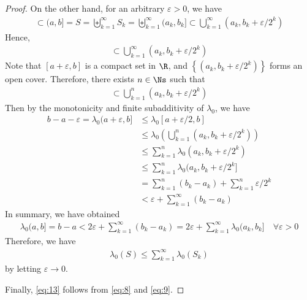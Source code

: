 \documentclass[thmcnt=section, 12pt]{elegantbook}
\begin{document}
\begin{proof}
    \par On the other hand, for an arbitrary $\varepsilon > 0$, we have 
    \begin{align*}
        [a + \varepsilon, b]
        \subset (a, b]
        = S
        = \biguplus_{k=1}^\infty S_k
        = \biguplus_{k=1}^\infty (a_k, b_k]
        \subset \bigcup_{k=1}^\infty (a_k, b_k + \varepsilon / 2^k)
    \end{align*}
    Hence,
    \begin{align*}
        [a + \varepsilon, b]
        \subset \bigcup_{k=1}^\infty (a_k, b_k + \varepsilon / 2^k)
    \end{align*}
    Note that $[a + \varepsilon, b]$ is a compact set in $\R$, and $\left\{(a_k, b_k + \varepsilon / 2^k)\right\}$ forms an open cover. Therefore, there exists $n \in \Ns$ such that 
    \begin{align*}
        [a + \varepsilon, b]
        \subset \bigcup_{k=1}^n (a_k, b_k + \varepsilon / 2^k)
    \end{align*}
    Then by the monotonicity and finite subadditivity of $\lambda_0$, we have 
    \begin{align*}
        b-a-\varepsilon 
        = \lambda_0 (a+\varepsilon, b]  
        &\leq \lambda_0 [a+\varepsilon/2, b] \\
        &\leq \lambda_0 \left( \bigcup_{k=1}^n (a_k, b_k + \varepsilon / 2^k) \right) \\
        &\leq \sum_{k=1}^n \lambda_0 (a_k, b_k + \varepsilon / 2^k) \\ 
        &\leq \sum_{k=1}^n \lambda_0 (a_k, b_k + \varepsilon / 2^k] \\
        &= \sum_{k=1}^n (b_k - a_k) + 
        \sum_{k=1}^n \varepsilon/2^k \\
        &< \varepsilon + \sum_{k=1}^\infty (b_k - a_k)
    \end{align*}
    In summary, we have obtained
    \begin{align*}
        \lambda_0 (a, b] = b - a 
        < 2\varepsilon + \sum_{k=1}^\infty (b_k - a_k)
        = 2\varepsilon + \sum_{k=1}^\infty \lambda_0 (a_k, b_k]
        \quad \forall \varepsilon > 0
    \end{align*}
    Therefore, we have 
    \begin{align}
        \lambda_0 (S) \leq \sum_{k=1}^\infty \lambda_0 (S_k)
        \label{eq:9}
    \end{align}
    by letting $\varepsilon \to 0$.

    \par Finally, \eqref{eq:13} follows from \eqref{eq:8} and \eqref{eq:9}.
\end{proof}
\end{document}
